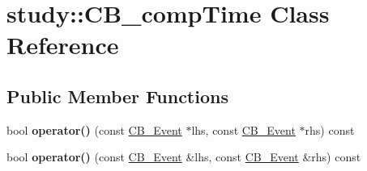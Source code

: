 \hypertarget{classstudy_1_1_c_b__comp_time}{\section{study\+:\+:C\+B\+\_\+comp\+Time Class Reference}
\label{classstudy_1_1_c_b__comp_time}
}
\subsection*{Public Member Functions}
\begin{DoxyCompactItemize}
\item 
\hypertarget{classstudy_1_1_c_b__comp_time_ac9ec555273a49821e0eba11d74c622c0}{bool {\bfseries operator()} (const \hyperlink{classstudy_1_1_c_b___event}{C\+B\+\_\+\+Event} $\ast$lhs, const \hyperlink{classstudy_1_1_c_b___event}{C\+B\+\_\+\+Event} $\ast$rhs) const }\label{classstudy_1_1_c_b__comp_time_ac9ec555273a49821e0eba11d74c622c0}

\item 
\hypertarget{classstudy_1_1_c_b__comp_time_a45175532ae16dc078c30a6a20615a553}{bool {\bfseries operator()} (const \hyperlink{classstudy_1_1_c_b___event}{C\+B\+\_\+\+Event} \&lhs, const \hyperlink{classstudy_1_1_c_b___event}{C\+B\+\_\+\+Event} \&rhs) const }\label{classstudy_1_1_c_b__comp_time_a45175532ae16dc078c30a6a20615a553}

\end{DoxyCompactItemize}
